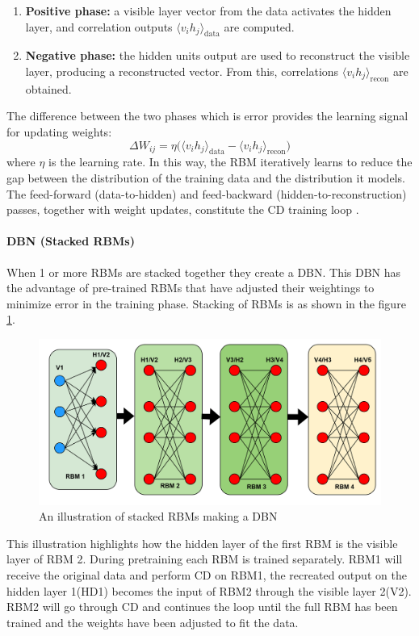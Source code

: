\begin{enumerate}
	\item \textbf{Positive phase:} a visible layer vector from the data activates the hidden layer, and correlation outputs $\langle v_i h_j \rangle_{\text{data}}$ are computed.
	\item \textbf{Negative phase:} the hidden units output are used to reconstruct the visible layer, producing a reconstructed vector. From this, correlations $\langle v_i h_j \rangle_{\text{recon}}$ are obtained.
\end{enumerate}

The difference between the two phases which is error provides the learning signal for updating weights:
\[
\Delta W_{ij} = \eta \Big( \langle v_i h_j \rangle_{\text{data}} - \langle v_i h_j \rangle_{\text{recon}} \Big)
\tag{22}
\label{eqn:14}
\]
where $\eta$ is the learning rate. In this way, the RBM iteratively learns to reduce the gap between the distribution of the training data and the distribution it models. The feed-forward (data-to-hidden) and feed-backward (hidden-to-reconstruction) passes, together with weight updates, constitute the CD training loop \cite{RBM_GeeksforGeeks}.

\paragraph{DBN (Stacked RBMs)} When 1 or more RBMs are stacked together they create a DBN. This DBN has the advantage of pre-trained RBMs that have adjusted their weightings to minimize error in the training phase. Stacking of RBMs is as shown in the figure \ref{fig:correctrbm}.
\begin{figure}[h]
	\centering
	\includegraphics[width=0.7\linewidth]{Chapters/images/CORRECT_RBM}
	\caption{An illustration of stacked RBMs making a DBN}
	\label{fig:correctrbm}
\end{figure} 
This illustration highlights how the hidden layer of the first RBM is the visible layer of RBM 2. During pretraining each RBM is trained separately. RBM1 will receive the original data and perform CD on RBM1, the recreated output on the hidden layer 1(HD1) becomes the input of RBM2 through the visible layer 2(V2). RBM2 will go through CD and continues the loop until the full RBM has been trained and the weights have been adjusted to fit the data.

